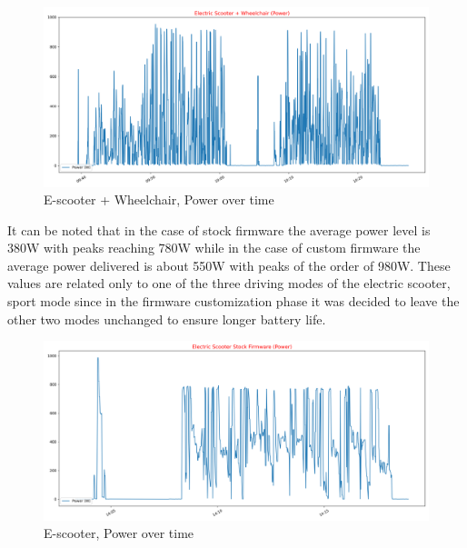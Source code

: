 \documentclass[binding=0.6cm,LaM,noexaminfo]{sapthesis}
\begin{document}
\begin{figure}[!htp]
    \centering
    \includegraphics[width=\textwidth]{images/graphs/1_power.png}
    \caption{E-scooter + Wheelchair, Power over time}
    \label{fig:1_power}
\end{figure}

\newpage
\noindent It can be noted that in the case of stock firmware the average power level is 380W with peaks reaching 780W while in the case of custom firmware the average power delivered is about 550W with peaks of the order of 980W. These values are related only to one of the three driving modes of the electric scooter, sport mode since in the firmware customization phase it was decided to leave the other two modes unchanged to ensure longer battery life.

\begin{figure}[!htp]
    \centering
    \includegraphics[width=\textwidth]{images/graphs/2_power.png}
    \caption{E-scooter, Power over time}
    \label{fig:2_power}
\end{figure}
\end{document}
